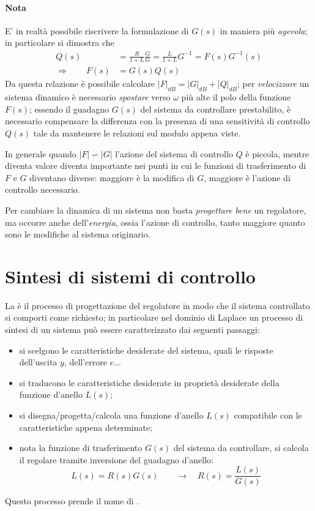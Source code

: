 		\paragraph{Nota} E' in realtà possibile riscrivere la formulazione di $G(s)$ in maniera più \textit{agevola}; in particolare si dimostra che
		\begin{align*}
			Q(s) & = \frac R {1+L} \frac G G = \frac L {1+L} G^{-1} = F(s) G^{-1}(s) \\
			\Rightarrow \qquad F(s)& = G(s) Q(s) 
		\end{align*}
		Da questa relazione è possibile calcolare $|F|_{dB} = |G|_{dB} + |Q|_{dB}$; per \textit{velocizzare} un sistema dinamico è necessario \textit{spostare} verso $\omega$ più alte il polo della funzione $F(s)$; essendo il guadagno $G(s)$ del sistema da controllare prestabilito, è necessario compensare la differenza con la presenza di una sensitività di controllo $Q(s)$ tale da mantenere le relazioni sul modulo appena viste.
		
		In generale quando $|F|\backsim|G|$ l'azione del sistema di controllo $Q$ è piccola, mentre diventa valore diventa importante nei punti in cui le funzioni di trasferimento di $F$ e $G$ diventano diverse: maggiore è la modifica di $G$, maggiore è l'azione di controllo necessario.
		
		\begin{concetto}
			Per cambiare la dinamica di un sistema non basta \textit{progettare bene} un regolatore, ma occorre anche dell'\textit{energia}, ossia l'azione di controllo, tanto maggiore quanto sono le modifiche al sistema originario.
		\end{concetto}
		
		
\section{Sintesi di sistemi di controllo}
	La  è il processo di progettazione del regolatore in modo che il sistema controllato si comporti come richiesto; in particolare nel dominio di Laplace un processo di sintesi di un sistema può essere caratterizzato dai seguenti passaggi:
	\begin{itemize}
		\item si scelgono le caratteristiche desiderate del sistema, quali le risposte dell'uscita $y$, dell'errore $e$...
		\item si traducono le caratteristiche desiderate in proprietà desiderate della funzione d'anello $L(s)$;
		\item si disegna/progetta/calcola una funzione d'anello $L(s)$ compatibile con le caratteristiche appena determinate;
		\item nota la funzione di trasferimento $G(s)$ del sistema da controllare, si calcola il regolare tramite inversione del guadagno d'anello:
		\[ L(s) = R(s) G(s) \qquad \rightarrow \quad R (s) = \frac{L(s)}{G(s)}\]
	\end{itemize}	
	Questo processo prende il nome di .

